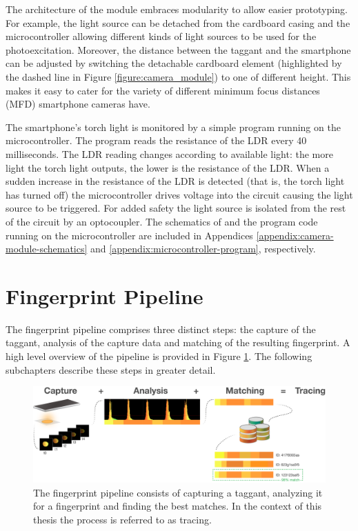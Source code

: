 \documentclass[thesis.tex]{subfiles}
\begin{document}
The architecture of the module embraces modularity to allow easier prototyping. For example, the light source can be detached from the cardboard casing and the microcontroller allowing different kinds of light sources to be used for the photoexcitation. Moreover, the distance between the taggant and the smartphone can be adjusted by switching the detachable cardboard element (highlighted by the dashed line in Figure \ref{figure:camera_module}) to one of different height. This makes it easy to cater for the variety of different minimum focus distances (MFD) smartphone cameras have.

The smartphone's torch light is monitored by a simple program running on the microcontroller. The program reads the resistance of the LDR every 40 milliseconds. The LDR reading changes according to available light: the more light the torch light outputs, the lower is the resistance of the LDR. When a sudden increase in the resistance of the LDR is detected (that is, the torch light has turned off) the microcontroller drives voltage into the circuit causing the light source to be triggered. For added safety the light source is isolated from the rest of the circuit by an optocoupler. The schematics of and the program code running on the microcontroller are included in Appendices \ref{appendix:camera-module-schematics} and \ref{appendix:microcontroller-program}, respectively.

\section{Fingerprint Pipeline}
\label{chapter:fingerprint-pipeline}

The fingerprint pipeline comprises three distinct steps: the capture of the taggant, analysis of the capture data and matching of the resulting fingerprint. A high level overview of the pipeline is provided in Figure \ref{figure:fingerprint-pipeline}. The following subchapters describe these steps in greater detail.

\begin{figure}[h]
\centering \includegraphics[width=\textwidth,height=\textheight,keepaspectratio=true]{images/design_implementation/fingerprint_pipeline.pdf}
\caption{The fingerprint pipeline consists of capturing a taggant, analyzing it for a fingerprint and finding the best matches. In the context of this thesis the process is referred to as tracing. \label{figure:fingerprint-pipeline}}
\end{figure}
\end{document}
